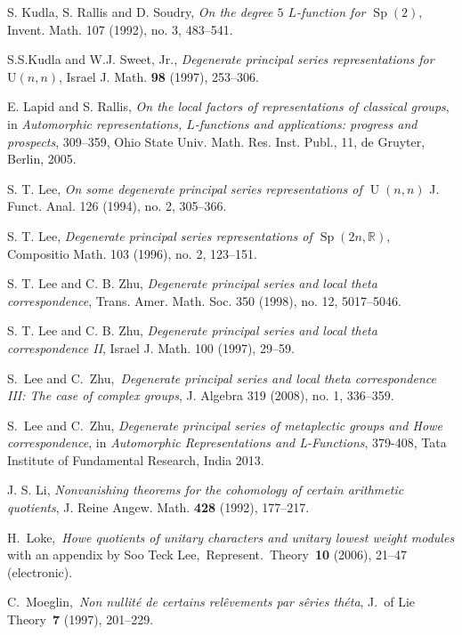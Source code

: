 \documentclass[10pt]{amsart}
\theoremstyle{plain}
\numberwithin{equation}{section}
\begin{document}
\begin{thebibliography}{99}
  S. Kudla, S. Rallis and D. Soudry, {\em On the
     degree $5$ $L$-function for ${\operatorname{Sp}}(2)$}, Invent. Math. 107 (1992),
   no. 3, 483--541.

S.S.Kudla and W.J. Sweet, Jr.,
\emph{Degenerate principal series representations for $\mathrm{U}(n,n)$},
Israel J. Math. \textbf{98} (1997), 253--306.

  
  
 E. Lapid and S. Rallis, {\em On the local factors of
    representations of classical groups}, in {\em Automorphic
    representations, $L$-functions and applications: progress and
    prospects}, 309--359, Ohio State Univ. Math. Res. Inst. Publ., 11,
  de Gruyter, Berlin, 2005.

 
 S. T. Lee, {\em  On some degenerate principal series
    representations of ${\operatorname{U}}(n,n)$} J. Funct. Anal. 126 (1994), no. 2,
  305--366.

 S. T. Lee, {\em Degenerate principal series
    representations of ${\operatorname{Sp}}(2n,{\mathbb{R}})$}, Compositio Math. 103 (1996),
  no. 2, 123--151.

S. T. Lee and C. B. Zhu, {\em Degenerate principal series and local theta correspondence},
 Trans. Amer. Math. Soc. 350 (1998), no. 12, 5017--5046.

S. T. Lee and C. B. Zhu, {\em Degenerate principal series and local
  theta correspondence II}, Israel J. Math. 100 (1997), 29--59.

S.\ Lee and C.\ Zhu,\ {\it Degenerate principal series and local
theta correspondence III: The case of complex groups}, 
  J. Algebra 319 (2008), no. 1, 336--359. 

S.\ Lee and C.\ Zhu, {\it Degenerate principal series of metaplectic groups and Howe correspondence}, 
in {\em Automorphic Representations and L-Functions}, 379-408, Tata Institute of Fundamental Research, India 2013.

 J. S. Li, \emph{Nonvanishing theorems for the
    cohomology of certain arithmetic quotients},
J. Reine Angew. Math. \textbf{428} (1992), 177--217.

H.\ Loke,\ {\it Howe quotients of unitary characters and unitary
lowest weight modules} with an appendix by Soo Teck Lee,\
Represent.\ Theory\  \textbf{10} (2006), 21--47 (electronic).

C.\ Moeglin,\ {\it Non nullit\'{e} de certains rel\^evements par
s\^eries th\'eta}, J.\ of Lie Theory\ \textbf{7} (1997), 201--229.


\end{thebibliography}
\end{document}
